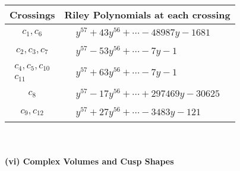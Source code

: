 \documentclass[1p]{elsarticle_modified}
\theoremstyle{definition}
\begin{document}
\begin{tabular}{m{50pt}|m{274pt}}
Crossings & \hspace{64pt}Riley Polynomials at each crossing \\
\hline $$\begin{aligned}c_{1},c_{6}\end{aligned}$$&$\begin{aligned}
&y^{57}+43 y^{56}+\cdots-48987 y-1681
\end{aligned}$\\
\hline $$\begin{aligned}c_{2},c_{3},c_{7}\end{aligned}$$&$\begin{aligned}
&y^{57}-53 y^{56}+\cdots-7 y-1
\end{aligned}$\\
\hline $$\begin{aligned}c_{4},c_{5},c_{10}\\c_{11}\end{aligned}$$&$\begin{aligned}
&y^{57}+63 y^{56}+\cdots-7 y-1
\end{aligned}$\\
\hline $$\begin{aligned}c_{8}\end{aligned}$$&$\begin{aligned}
&y^{57}-17 y^{56}+\cdots+297469 y-30625
\end{aligned}$\\
\hline $$\begin{aligned}c_{9},c_{12}\end{aligned}$$&$\begin{aligned}
&y^{57}+27 y^{56}+\cdots-3483 y-121
\end{aligned}$\\
\hline
\end{tabular}\\~\\
\newpage\flushleft \textbf{(vi) Complex Volumes and Cusp Shapes}
\end{document}
